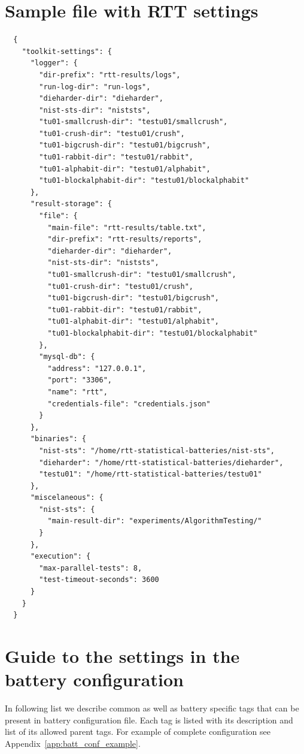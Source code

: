 \documentclass[
  digital,  	%
  color,		%
  oneside,   	%
  12pt,
  nocover,
  notable,
  nolof,
  nolot,
]{fithesis3}
\theoremstyle{definition}
\theoremstyle{remark}
\begin{document}
\chapter{Sample file with RTT settings}
\label{app:rtt_sett_json}
\begin{verbatim}
  {
    "toolkit-settings": {
      "logger": {
        "dir-prefix": "rtt-results/logs",
        "run-log-dir": "run-logs",
        "dieharder-dir": "dieharder",
        "nist-sts-dir": "niststs",
        "tu01-smallcrush-dir": "testu01/smallcrush",
        "tu01-crush-dir": "testu01/crush",
        "tu01-bigcrush-dir": "testu01/bigcrush",
        "tu01-rabbit-dir": "testu01/rabbit",
        "tu01-alphabit-dir": "testu01/alphabit",
        "tu01-blockalphabit-dir": "testu01/blockalphabit"
      },
      "result-storage": {
        "file": {
          "main-file": "rtt-results/table.txt",
          "dir-prefix": "rtt-results/reports",
          "dieharder-dir": "dieharder",
          "nist-sts-dir": "niststs",
          "tu01-smallcrush-dir": "testu01/smallcrush",
          "tu01-crush-dir": "testu01/crush",
          "tu01-bigcrush-dir": "testu01/bigcrush",
          "tu01-rabbit-dir": "testu01/rabbit",
          "tu01-alphabit-dir": "testu01/alphabit",
          "tu01-blockalphabit-dir": "testu01/blockalphabit"
        },
        "mysql-db": {
          "address": "127.0.0.1",
          "port": "3306",
          "name": "rtt",
          "credentials-file": "credentials.json"
        }
      },
      "binaries": {
        "nist-sts": "/home/rtt-statistical-batteries/nist-sts",
        "dieharder": "/home/rtt-statistical-batteries/dieharder",
        "testu01": "/home/rtt-statistical-batteries/testu01"
      },
      "miscelaneous": {
        "nist-sts": {
          "main-result-dir": "experiments/AlgorithmTesting/"
        }
      },
      "execution": {
        "max-parallel-tests": 8,
        "test-timeout-seconds": 3600
      }
    }
  }
\end{verbatim}

\chapter{Guide to the settings in the battery configuration}
\label{app:batt_conf_guide}
In following list we describe common as well as battery specific tags that can be present in battery configuration file. Each tag is listed with its description and list of its allowed parent tags. For example of complete configuration see Appendix~\ref{app:batt_conf_example}.
\end{document}
